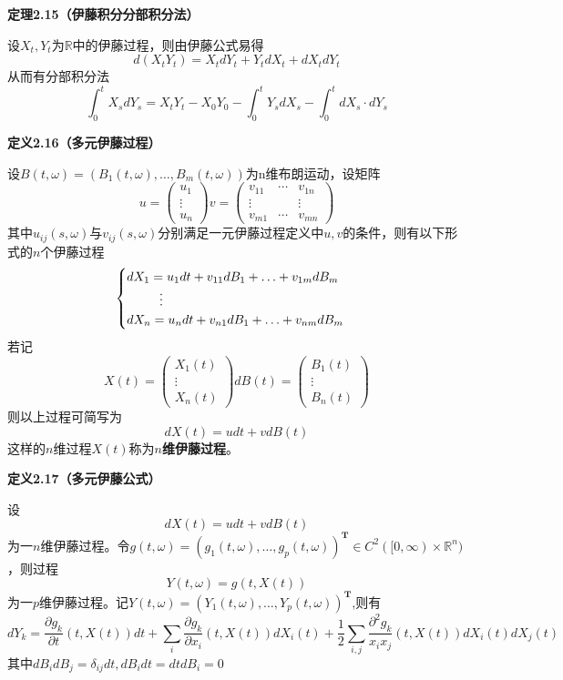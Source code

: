 \documentclass[UTF8，12pt]{ctexart}
\numberwithin{equation}{section}
\begin{document}
\vspace{0.3cm}
\noindent \textbf{定理2.15（伊藤积分分部积分法）}

设$X_t,Y_t$为$\mathbb{R}$中的伊藤过程，则由伊藤公式易得
\[
d(X_tY_t)=X_tdY_t+Y_tdX_t+dX_tdY_t
\]
从而有分部积分法
\[
\int_{0}^{t}X_sdY_s=X_tY_t-X_0Y_0-\int_{0}^{t}Y_sdX_s-\int_{0}^{t}dX_s\cdot dY_s
\]

\vspace{0.3cm}
\noindent \textbf{定义2.16（多元伊藤过程）}

设$B(t,\omega)=(B_1(t,\omega),\ldots,B_m(t,\omega))$为n维布朗运动，设矩阵
\[
u=
\begin{pmatrix}
	u_1 \\
	\vdots \\
	u_n
\end{pmatrix}
v=
\begin{pmatrix}
	v_{11} &\cdots & v_{1n} \\
	\vdots & &\vdots \\
	v_{m1} &\cdots & v_{mn}
\end{pmatrix}
\]
其中$u_{ij}(s,\omega)与v_{ij}(s,\omega)$分别满足一元伊藤过程定义中$u,v$的条件，则有以下形式的$n$个伊藤过程
\[
\begin{cases}
	dX_1=u_1dt+v_{11}dB_1+\ldots+v_{1m}dB_m\\
	\hspace{0.9cm}\vdots\\
	dX_n=u_ndt+v_{n1}dB_1+\ldots+v_{nm}dB_m
\end{cases}
\]
若记
\[
X(t)=
\begin{pmatrix}
	X_1(t) \\
	\vdots \\
	X_n(t)
\end{pmatrix}
dB(t)=
\begin{pmatrix}
	B_1(t) \\
	\vdots \\
	B_n(t)
\end{pmatrix}
\]
则以上过程可简写为
\[
dX(t)=udt+vdB(t)
\]
这样的$n$维过程$X(t)$称为\textbf{$n$维伊藤过程}。

\vspace{0.3cm}
\noindent \textbf{定义2.17（多元伊藤公式）}

设
\[
dX(t)=udt+vdB(t)
\]
为一$n$维伊藤过程。令$g(t,\omega)=(g_1(t,\omega),\ldots,g_p(t,\omega))^\mathbf{T}\in C^2([0,\infty)\times\mathbb{R}^n)$，则过程
\[
Y(t,\omega)=g(t,X(t))
\]
为一$p$维伊藤过程。记$Y(t,\omega)=(Y_1(t,\omega),\ldots,Y_p(t,\omega))^\mathbf{T}$,则有
\[
dY_k=\frac{\partial g_k}{\partial t}(t,X(t))dt+\sum_i\frac{\partial g_k}{\partial x_i}(t,X(t))dX_i(t)+\frac{1}{2}\sum_{i,j}\frac{\partial^2g_k}{x_i x_j}(t,X(t))dX_i(t)dX_j(t)
\]
其中$dB_idB_j=\delta_{ij}dt,dB_idt=dtdB_i=0$
\end{document}
